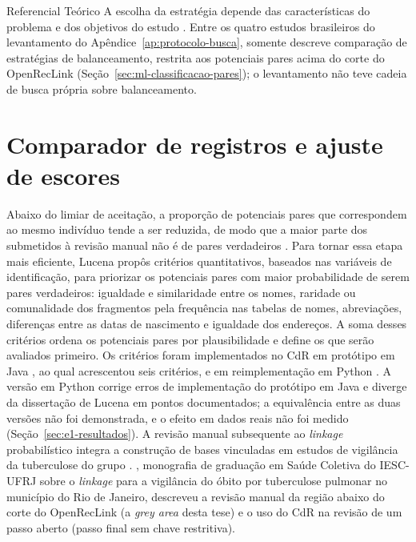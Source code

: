 \begin{chapter}{Referencial Teórico}
A escolha da estratégia depende das características do problema e dos objetivos do estudo \cite{Christen2012book,Hassani2025oversampling}. Entre os quatro estudos brasileiros do levantamento do Apêndice~\ref{ap:protocolo-busca}, somente  descreve comparação de estratégias de balanceamento, restrita aos potenciais pares acima do corte do OpenRecLink (Seção~\ref{sec:ml-classificacao-pares}); o levantamento não teve cadeia de busca própria sobre balanceamento.


\section{Comparador de registros e ajuste de escores}\label{sec:ajustes-escores}

Abaixo do limiar de aceitação, a proporção de potenciais pares que correspondem ao mesmo indivíduo tende a ser reduzida, de modo que a maior parte dos submetidos à revisão manual não é de pares verdadeiros \cite{Christen2012book}. Para tornar essa etapa mais eficiente, Lucena \citeyearpar{Lucena2013algoritmos} propôs critérios quantitativos, baseados nas variáveis de identificação, para priorizar os potenciais pares com maior probabilidade de serem pares verdadeiros: igualdade e similaridade entre os nomes, raridade ou comunalidade dos fragmentos pela frequência nas tabelas de nomes, abreviações, diferenças entre as datas de nascimento e igualdade dos endereços. A soma desses critérios ordena os potenciais pares por plausibilidade e define os que serão avaliados primeiro. Os critérios foram implementados no CdR em protótipo em Java \cite{Pecanha2015comparador}, ao qual  acrescentou seis critérios, e em reimplementação em Python \cite{Jardim2025comparador}. A versão em Python corrige erros de implementação do protótipo em Java e diverge da dissertação de Lucena em pontos documentados; a equivalência entre as duas versões não foi demonstrada, e o efeito em dados reais não foi medido (Seção~\ref{sec:e1-resultados}). A revisão manual subsequente ao \textit{linkage} probabilístico integra a construção de bases vinculadas em estudos de vigilância da tuberculose do grupo \cite{Rocha2015causas, DiazQuijano2026ethambutol, Ferreira2021tuberculoseAPS, Arruda2026internacoesTB}. , monografia de graduação em Saúde Coletiva do IESC-UFRJ sobre o \textit{linkage} para a vigilância do óbito por tuberculose pulmonar no município do Rio de Janeiro, descreveu a revisão manual da região abaixo do corte do OpenRecLink (a \textit{grey area} desta tese) e o uso do CdR na revisão de um passo aberto (passo final sem chave restritiva).


\end{chapter}
